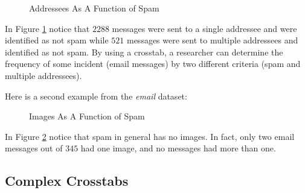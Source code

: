 \begin{figure}[H]
  \begin{center}
    \caption{Addressees As A Function of Spam}
    \label{fre:img03}
  \end{center}
\end{figure}

In Figure \ref{fre:img03} notice that $ 2288 $ messages were sent to a single addressee and were identified as not spam while $ 521 $ messages were sent to multiple addressees and identified as not spam. By using a crosstab, a researcher can determine the frequency of some incident (email messages) by two different criteria (spam and multiple addressees). 

Here is a second example from the \textit{email} dataset:

\begin{figure}[H]
  \begin{center}
    \caption{Images As A Function of Spam}
    \label{fre:img04}
  \end{center}
\end{figure}

In Figure \ref{fre:img04} notice that spam in general has no images. In fact, only two email messages out of $ 345 $ had one image, and no messages had more than one.

\subsection{Complex Crosstabs}

